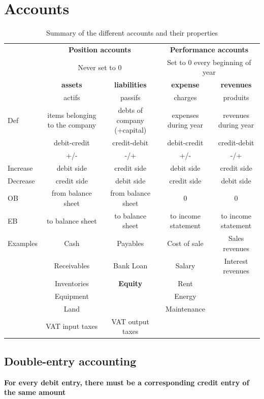 \documentclass[a4paper] {scrartcl}
\begin{document}
\section{Accounts}
\begin{table}
\centering
\begin{tabular}{l|c|c || c | c}
	&\multicolumn{2}{c||}{\textbf{Position accounts}}&
	\multicolumn{2}{c}{\textbf{Performance accounts}}\\
	
	&\multicolumn{2}{c||}{Never set to $0$}&
	\multicolumn{2}{c}{Set to $0$ every beginning of year}\\
	
	\hline
	&\textbf{assets} & \textbf{liabilities} & \textbf{expense }& \textbf{revenues}\\
	&actifs & passifs & charges & produits\\
	\hline
	Def &items belonging to the company & debts of company (+capital) 
	& expenses during year & revenues during year
	\\
	&debit-credit & credit-debit & debit-credit & credit-debit\\
	&+/- & -/+ & +/- & -/+\\
	Increase & debit side & credit side& debit side &credit side\\
	Decrease&credit side &debit side& credit side & debit side\\
	OB & from balance sheet & from balance sheet & $0$ & $0$\\
	EB & to balance sheet & to balance sheet & to income statement & to income statement\\
	\hline
	Examples&Cash & Payables & Cost of sale & Sales revenues\\
	&Receivables   & Bank Loan & Salary & Interest revenues\\
	&Inventories & \textbf{Equity} & Rent & \\
	&Equipment  &		& Energy  &\\
	&Land && Maintenance&\\
	& VAT input taxes & VAT output taxes &&
\end{tabular}
\caption{Summary of the different accounts and their properties}
\end{table}

\subsection{Double-entry accounting}
\textbf{For every debit entry, there must be a corresponding credit entry of the same amount}
\end{document}
